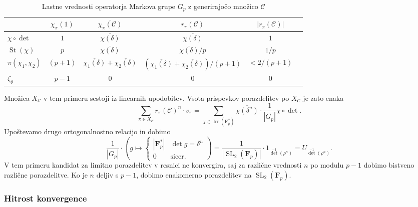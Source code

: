 \documentclass[11pt]{book}
\def\conclass{\mathcal{C}}
\def\FF{\mathbf{F}}
\DeclareMathOperator\Irr{Irr}
\DeclareMathOperator\St{St}
\DeclareMathOperator\SL{SL}
\theoremstyle{definition}
\theoremstyle{zgled}
\theoremstyle{odprtproblem}
\theoremstyle{domacanaloga}
\theoremstyle{izrek}
\begin{document}
\begin{table}[ht]
    \centering
    \small
\begin{tabular}{l|*{5}{c}}
    & 
    $\chi_{\pi}(1)$
    &
    $\overline{\chi_{\pi}(\conclass)}$
    &
    $r_{\pi}(\conclass)$
    &
    $\left| r_{\pi}(\conclass) \right|$ \\ \hline
    $\chi \circ \det$ & $1$ & $\overline{\chi(\delta)}$ &  $\overline{\chi(\delta)}$ & $1$ \\
    $\St(\chi)$ & $p$ & $\overline{\chi(\delta)}$ & $\overline{\chi(\delta)} / p$ & $1/p$ \\
    $\pi(\chi_1, \chi_2)$ & $(p+1)$ & $\overline{\chi_1(\delta)} + \overline{\chi_2(\delta)}$ & $(\overline{\chi_1(\delta)} + \overline{\chi_2(\delta)})/(p+1)$ & $< 2/(p+1)$ \\
    $\zeta_{\theta}$ & $p-1$ & $0$ & $0$ & $0$ \\
\end{tabular}
\caption{Lastne vrednosti operatorja Markova grupe $G_p$ z generirajočo množico $\conclass$}
\end{table}

Množica $X_{\conclass}$ v tem primeru sestoji iz linearnih upodobitev. Vsota prispevkov porazdelitev po $X_{\conclass}$ je zato enaka
\[
    \sum_{\pi \in X_{\conclass}} r_{\pi}(\conclass)^n \cdot v_{\pi}
    = \sum_{\chi \in \Irr(\FF_p^*)} \overline{\chi(\delta^{n})} \cdot \frac{1}{|G_p|} \chi \circ \det.
\]
Upoštevamo drugo ortogonalnostno relacijo in dobimo
\[
    \frac{1}{|G_p|} \cdot \left( g \mapsto \begin{cases}
        |\FF_p^*| & \det g = \delta^n \\
        0 & \text{sicer.}
    \end{cases}
    \right)    
    = \frac{1}{|\SL_2(\FF_p)|} \cdot 1_{\det^{-1}(\rho^n)}
    = U_{\det^{-1}(\rho^n)}.
\]
V tem primeru kandidat za limitno porazdelitev v resnici ne konvergira, saj za različne vrednosti $n$ po modulu $p-1$ dobimo bistveno različne porazdelitve. Ko je $n$ deljiv s $p-1$, dobimo enakomerno porazdelitev na $\SL_2(\FF_p)$. 

\subsubsection{Hitrost konvergence}
\end{document}

